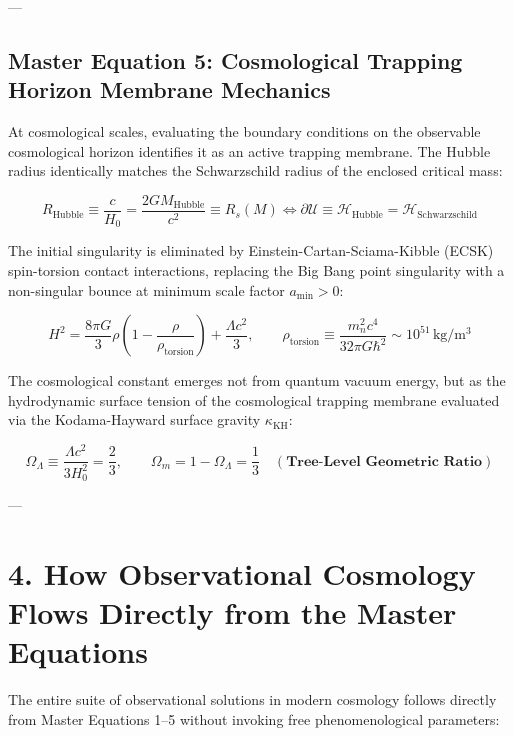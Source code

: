 \documentclass[11pt,a4paper]{article}
\theoremstyle{definition}
\theoremstyle{remark}
\begin{document}
---

\subsection{Master Equation 5: Cosmological Trapping Horizon Membrane Mechanics}
At cosmological scales, evaluating the boundary conditions on the observable cosmological horizon identifies it as an active trapping membrane. The Hubble radius identically matches the Schwarzschild radius of the enclosed critical mass:


\begin{equation}
\boxed{R_{\text{Hubble}} \equiv \frac{c}{H_0} = \frac{2 G M_{\text{Hubble}}}{c^2} \equiv R_s(M) \iff \partial\mathcal{U} \equiv \mathcal{H}_{\text{Hubble}} = \mathcal{H}_{\text{Schwarzschild}}}
\end{equation}


The initial singularity is eliminated by Einstein-Cartan-Sciama-Kibble (ECSK) spin-torsion contact interactions, replacing the Big Bang point singularity with a non-singular bounce at minimum scale factor $a_{\text{min}} > 0$:


\begin{equation}
\boxed{H^2 = \frac{8\pi G}{3}\rho \left( 1 - \frac{\rho}{\rho_{\text{torsion}}} \right) + \frac{\Lambda c^2}{3}, \qquad \rho_{\text{torsion}} \equiv \frac{m_n^2 c^4}{32\pi G \hbar^2} \sim 10^{51} \, \mathrm{kg/m^3}}
\end{equation}


The cosmological constant emerges not from quantum vacuum energy, but as the hydrodynamic surface tension of the cosmological trapping membrane evaluated via the Kodama-Hayward surface gravity $\kappa_{\text{KH}}$:


\begin{equation}
\boxed{\Omega_\Lambda \equiv \frac{\Lambda c^2}{3 H_0^2} = \frac{2}{3}, \qquad \Omega_m = 1 - \Omega_\Lambda = \frac{1}{3} \quad (\textbf{Tree-Level Geometric Ratio})}
\end{equation}


---

\section{4. How Observational Cosmology Flows Directly from the Master Equations}

The entire suite of observational solutions in modern cosmology follows directly from Master Equations 1–5 without invoking free phenomenological parameters:
\end{document}
